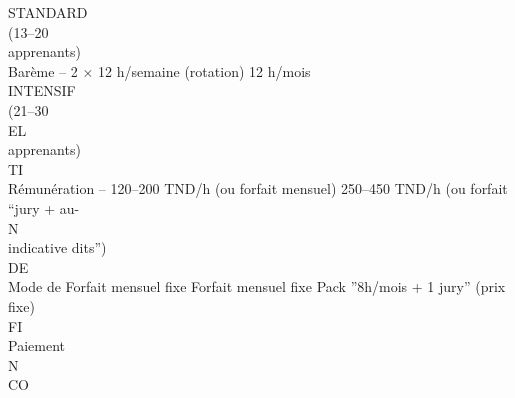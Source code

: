 STANDARD\\
(13–20\\
apprenants)\\
\vspace{0.5em}
Barème         –                       2 × 12 h/semaine (rotation)           12 h/mois\\
INTENSIF\\
(21–30\\
\vspace{0.5em}
\vspace{0.5em}
\vspace{0.5em}
\vspace{0.5em}
EL\\
apprenants)\\
\vspace{0.5em}
\vspace{0.5em}
\vspace{0.5em}
\vspace{0.5em}
TI\\
Rémunération –                         120–200 TND/h (ou forfait mensuel)    250–450 TND/h (ou forfait “jury + au-\\
\vspace{0.5em}
\vspace{0.5em}
\vspace{0.5em}
\vspace{0.5em}
N\\
indicative                                                                   dits”)\\
\vspace{0.5em}
\vspace{0.5em}
\vspace{0.5em}
\vspace{0.5em}
DE\\
Mode de        Forfait mensuel fixe    Forfait mensuel fixe                  Pack ”8h/mois + 1 jury” (prix fixe)\\
\vspace{0.5em}
\vspace{0.5em}
\vspace{0.5em}
\vspace{0.5em}
FI\\
Paiement\\
\vspace{0.5em}
\vspace{0.5em}
\vspace{0.5em}
N\\
CO\\
\vspace{0.5em}

